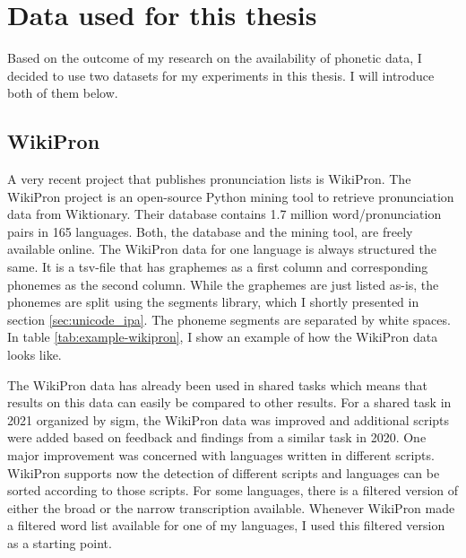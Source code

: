 \section{Data used for this thesis}
\label{sec:dataset}
Based on the outcome of my research on the availability of phonetic data, I decided to use two datasets for my experiments in this thesis. I will introduce both of them below. 

\subsection{WikiPron}
\label{sec:wikipron}
A very recent project that publishes pronunciation lists is WikiPron. The WikiPron project \citep{Lee&Ashby.2020} is an open-source Python mining tool to retrieve pronunciation data from Wiktionary. Their database contains 1.7 million word/pronunciation pairs in 165 languages. Both, the database and the mining tool, are freely available online. The WikiPron data for one language is always structured the same. It is a tsv-file that has graphemes as a first column and corresponding phonemes as the second column. While the graphemes are just listed as-is, the phonemes are split using the segments library, which I shortly presented in section \ref{sec:unicode_ipa}. The phoneme segments are separated by white spaces. In table \ref{tab:example-wikipron}, I show an example of how the WikiPron data looks like.

The WikiPron data has already been used in shared tasks which means that results on this data can easily be compared to other results. For a shared task in 2021 organized by \ac{sigm}, the WikiPron data was improved and additional scripts were added based on feedback and findings from a similar task in 2020. One major improvement was concerned with languages written in different scripts. WikiPron supports now the detection of different scripts and languages can be sorted according to those scripts. For some languages, there is a filtered version of either the broad or the narrow transcription available. Whenever WikiPron made a filtered word list available for one of my languages, I used this filtered version as a starting point.

